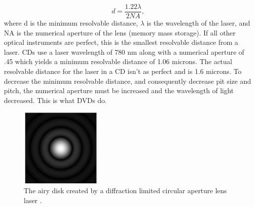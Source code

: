 \documentclass[ notitlepage, numerical, 11pt]{revtex4-1} %
\begin{document}
\begin{equation}
d = \frac{1.22\lambda}{2NA},
\label{rayleigh}
\end{equation}
where d is the minimum resolvable distance, $\lambda$ is the wavelength of the laser, and NA is the numerical aperture of the lens (memory mass storage). If all other optical instruments are perfect, this is the smallest resolvable distance from a laser. CDs use a laser wavelength of 780 nm along with a numerical aperture of .45 which yields a minimum resolvable distance of 1.06 microns. The actual resolvable distance for the laser in a CD isn't as perfect and is 1.6 microns. To decrease the minimum resolvable distance, and consequently decrease pit size and pitch, the numerical aperture must be increased and the wavelength of light decreased. This is what DVDs do.

\begin{figure}[H]
\centerline{\includegraphics[scale=2]{220px-Airy-pattern.png}}
\caption{The airy disk created by a diffraction limited circular aperture lens laser \cite{airyDisk}.}
\label{airy}
\end{figure} 
\end{document}
